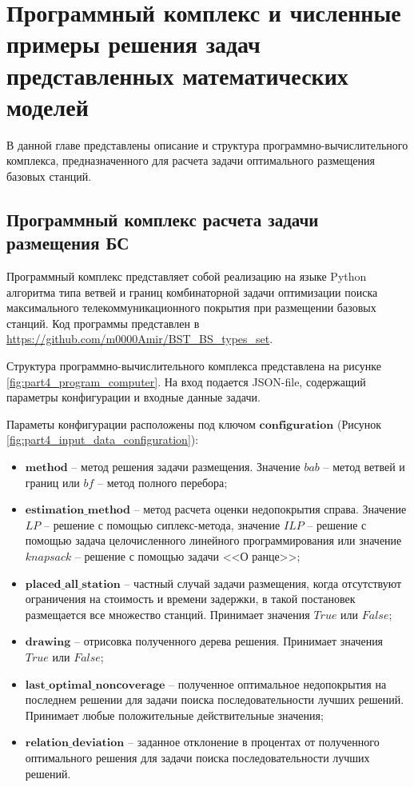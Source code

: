 \chapter{Программный комплекс и численные примеры решения задач представленных математических моделей}\label{part4}

В данной главе представлены описание и структура программно-вычислительного комплекса, предназначенного для расчета задачи оптимального размещения базовых станций.

\section{Программный комплекс расчета задачи размещения БС}

Программный комплекс представляет собой реализацию на языке Python алгоритма типа ветвей и границ комбинаторной задачи оптимизации поиска максимального телекоммуникационного покрытия при размещении базовых станций. Код программы представлен в \url{https://github.com/m0000Amir/BST_BS_types_set}.

Структура программно-вычислительного комплекса представлена на рисунке \ref{fig:part4_program_computer}. На вход подается JSON-file, содержащий параметры конфигурации и входные данные задачи.

 Параметы конфигурации расположены под ключом $\textbf{configuration}$ (Рисунок \cref{fig:part4_input_data_configuration}):
 \begin{itemize}
   \item $\textbf{method}$ -- метод решения задачи размещения. Значение $\textit{bab}$ -- метод ветвей и границ или $\textit{bf}$  -- метод полного перебора;
   \item $\textbf{estimation\_method}$ -- метод расчета оценки недопокрытия справа. Значение $\textit{LP}$ -- решение с помощью сиплекс-метода, значение $\textit{ILP}$ -- решение с помощью задача целочисленного линейного программирования или значение $\textit{knapsack}$ -- решение с помощью задачи <<О ранце>>;
   \item $\textbf{placed\_all\_station}$ -- частный случай задачи размещения, когда отсутствуют ограничения на стоимость и времени задержки, в такой постановек размещается все множество станций. Принимает значения $\textit{True}$ или $\textit{False}$;
   \item $\textbf{drawing}$ -- отрисовка полученного дерева решения.  Принимает значения $\textit{True}$ или $\textit{False}$;
   \item $\textbf{last\_optimal\_noncoverage}$ -- полученное оптимальное недопокрытия на последнем решении  для задачи поиска последовательности лучших решений. Принимает любые положительные действительные значения;
   \item $\textbf{relation\_deviation}$ -- заданное отклонение в процентах от полученного оптимального решения для задачи поиска последовательности лучших решений.
 \end{itemize}



